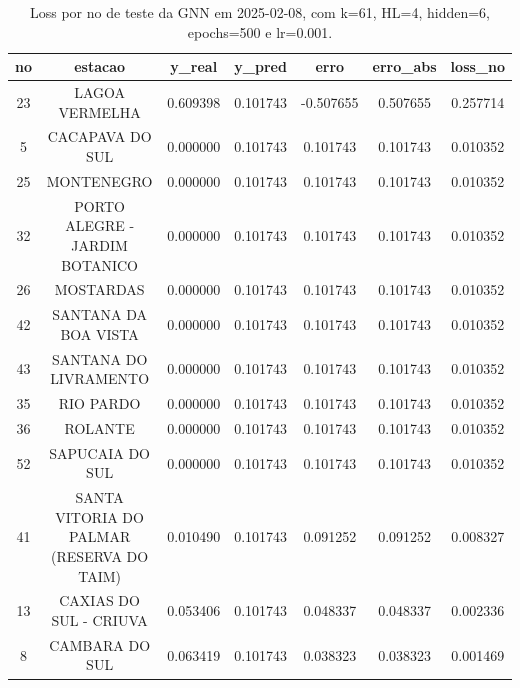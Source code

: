 \begin{table}[h]
\centering
\caption{Loss por no de teste da GNN em 2025-02-08, com k=61, HL=4, hidden=6, epochs=500 e lr=0.001.}
\label{tab:gnn_loss_k61_hl4_h6_e500_d20250208}
\begin{tabular}{ccccccc}
\toprule
no & estacao & y\_real & y\_pred & erro & erro\_abs & loss\_no \\
\midrule
23 & LAGOA VERMELHA & 0.609398 & 0.101743 & -0.507655 & 0.507655 & 0.257714 \\
5 & CACAPAVA DO SUL & 0.000000 & 0.101743 & 0.101743 & 0.101743 & 0.010352 \\
25 & MONTENEGRO & 0.000000 & 0.101743 & 0.101743 & 0.101743 & 0.010352 \\
32 & PORTO ALEGRE - JARDIM BOTANICO & 0.000000 & 0.101743 & 0.101743 & 0.101743 & 0.010352 \\
26 & MOSTARDAS & 0.000000 & 0.101743 & 0.101743 & 0.101743 & 0.010352 \\
42 & SANTANA DA BOA VISTA & 0.000000 & 0.101743 & 0.101743 & 0.101743 & 0.010352 \\
43 & SANTANA DO LIVRAMENTO & 0.000000 & 0.101743 & 0.101743 & 0.101743 & 0.010352 \\
35 & RIO PARDO & 0.000000 & 0.101743 & 0.101743 & 0.101743 & 0.010352 \\
36 & ROLANTE & 0.000000 & 0.101743 & 0.101743 & 0.101743 & 0.010352 \\
52 & SAPUCAIA DO SUL & 0.000000 & 0.101743 & 0.101743 & 0.101743 & 0.010352 \\
41 & SANTA VITORIA DO PALMAR (RESERVA DO TAIM) & 0.010490 & 0.101743 & 0.091252 & 0.091252 & 0.008327 \\
13 & CAXIAS DO SUL - CRIUVA & 0.053406 & 0.101743 & 0.048337 & 0.048337 & 0.002336 \\
8 & CAMBARA DO SUL & 0.063419 & 0.101743 & 0.038323 & 0.038323 & 0.001469 \\
\bottomrule
\end{tabular}
\end{table}
